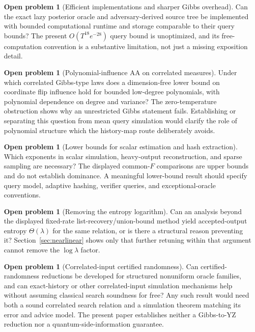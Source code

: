 \documentclass[11pt]{article}
\theoremstyle{definition}\newtheorem{definition}[theorem]{Definition}
\newtheorem{problem}[theorem]{Open problem}
\theoremstyle{remark}\newtheorem{remark}[theorem]{Remark}
\begin{document}
\begin{problem}[Efficient implementations and sharper Gibbs overhead]
Can the exact lazy posterior oracle and adversary-derived source tree be implemented with bounded computational runtime and storage comparable to their query bounds? The present \(O(T^{18}e^{-28})\) query bound is unoptimized, and its free-computation convention is a substantive limitation, not just a missing exposition detail.
\end{problem}

\begin{problem}[Polynomial-influence AA on correlated measures]
Under which correlated Gibbs-type laws does a dimension-free lower bound on coordinate flip influence hold for bounded low-degree polynomials, with polynomial dependence on degree and variance? The zero-temperature obstruction shows why an unrestricted Gibbs statement fails. Establishing or separating this question from mean query simulation would clarify the role of polynomial structure which the history-map route deliberately avoids.
\end{problem}

\begin{problem}[Lower bounds for scalar estimation and hash extraction]
Which exponents in scalar simulation, heavy-output reconstruction, and sparse sampling are necessary? The displayed common-\(F\) comparisons are upper bounds and do not establish dominance. A meaningful lower-bound result should specify query model, adaptive hashing, verifier queries, and exceptional-oracle conventions.
\end{problem}

\begin{problem}[Removing the entropy logarithm]
Can an analysis beyond the displayed fixed-rate list-recovery/union-bound method yield accepted-output entropy \(\Theta(\lambda)\) for the same relation, or is there a structural reason preventing it? Section~\ref{sec:nearlinear} shows only that further retuning within that argument cannot remove the \(\log\lambda\) factor.
\end{problem}

\begin{problem}[Correlated-input certified randomness]
Can certified-randomness reductions be developed for structured nonuniform oracle families, and can exact-history or other correlated-input simulation mechanisms help without assuming classical search soundness for free? Any such result would need both a sound correlated search relation and a simulation theorem matching its error and advice model. The present paper establishes neither a Gibbs-to-YZ reduction nor a quantum-side-information guarantee.
\end{problem}
\end{document}
